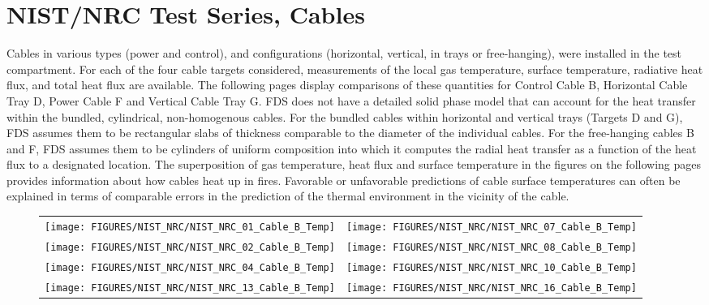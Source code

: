 \section{NIST/NRC Test Series, Cables}

Cables in various types (power and control), and configurations (horizontal, vertical, in trays or free-hanging), were installed in
the test compartment.
For each of the four cable targets considered, measurements of the local gas temperature, surface temperature, radiative heat flux,
and total heat flux are available.  The following pages display comparisons of these quantities for
Control Cable B, Horizontal Cable Tray D, Power Cable F and Vertical Cable Tray G.
FDS does not have a detailed solid phase model that can account for the heat transfer within the bundled,
cylindrical, non-homogenous cables.  For the bundled cables within horizontal and vertical trays (Targets D and G),
FDS assumes them to be rectangular slabs of thickness comparable to the diameter of the individual cables.
For the free-hanging cables B and F, FDS assumes them to be cylinders of uniform composition into which it
computes the radial heat transfer as a function of the heat flux to a designated location.
The superposition of gas temperature, heat flux and surface temperature in the figures on the following pages
provides information about how cables heat up in fires.  Favorable or unfavorable predictions of cable surface
temperatures can often be explained in terms of comparable errors in the prediction of the thermal environment in the vicinity of the cable.

\newpage

\begin{figure}[p]
\begin{tabular*}{\textwidth}{l@{\extracolsep{\fill}}r}
\texttt{[image: FIGURES/NIST\_NRC/NIST\_NRC\_01\_Cable\_B\_Temp]} &
\texttt{[image: FIGURES/NIST\_NRC/NIST\_NRC\_07\_Cable\_B\_Temp]} \\
\texttt{[image: FIGURES/NIST\_NRC/NIST\_NRC\_02\_Cable\_B\_Temp]} &
\texttt{[image: FIGURES/NIST\_NRC/NIST\_NRC\_08\_Cable\_B\_Temp]} \\
\texttt{[image: FIGURES/NIST\_NRC/NIST\_NRC\_04\_Cable\_B\_Temp]} &
\texttt{[image: FIGURES/NIST\_NRC/NIST\_NRC\_10\_Cable\_B\_Temp]} \\
\texttt{[image: FIGURES/NIST\_NRC/NIST\_NRC\_13\_Cable\_B\_Temp]} &
\texttt{[image: FIGURES/NIST\_NRC/NIST\_NRC\_16\_Cable\_B\_Temp]}
\end{tabular*}
\label{NIST_NRC_Cable_B_Closed}
\end{figure}

